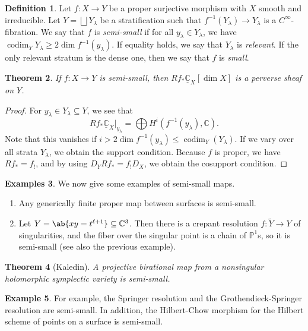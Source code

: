 \documentclass{amsart}
\newtheorem{thm}{Theorem}[section]
\theoremstyle{definition}
\newtheorem{defn}[thm]{Definition}
\newtheorem{exm}[thm]{Example}
\newtheorem{exms}[thm]{Examples}
\theoremstyle{remark}
\theoremstyle{plain}
\theoremstyle{definition}
\theoremstyle{remark}
\newcommand{\C}{\mathbb{C}}
\renewcommand{\P}{\mathbb{P}}
\newcommand{\on}[1]{\operatorname{#1}}
\newcommand{\ul}[1]{\underline{#1}}
\newcommand{\1}{\mathbf{1}}
\newcommand{\2}{\mathbf{2}}
\newcommand{\3}{\mathbf{3}}
\begin{document}
\begin{defn}
    Let \(f \colon X \to Y\) be a proper surjective morphism with \(X\) smooth and irreducible. Let \(Y = \bigsqcup Y_{\lambda}\) be a stratification such that \(f^{-1}(Y_{\lambda}) \to Y_{\lambda}\) is a \(C^{\infty}\)-fibration. We say that \(f\) is \textit{semi-small} if for all \(y_{\lambda} \in Y_{\lambda}\), we have \(\on{codim}_Y Y_{\lambda} \geq 2 \dim f^{-1} (y_{\lambda})\). If equality holds, we say that \(Y_{\lambda}\) is \textit{relevant}. If the only relevant stratum is the dense one, then we say that \(f\) is \textit{small}.
\end{defn}

\begin{thm}
    If \(f \colon X \to Y\) is semi-small, then \(R f_* \ul{\C}_X [\dim X]\) is a perverse sheaf on \(Y\).
\end{thm}

\begin{proof}
    For \(y_{\lambda} \in Y_{\lambda} \subseteq Y\), we see that
    \[ R f_* \ul{\C}_X |_{y_{\lambda}} = \bigoplus H^i (f^{-1}(y_{\lambda}), \C). \]
    Note that this vanishes if \(i > 2 \dim f^{-1}(y_{\lambda}) \leq \on{codim}_Y (Y_{\lambda})\). If we vary over all strata \(Y_{\lambda}\), we obtain the support condition. Because \(f\) is proper, we have \(R f_* = f_!\), and by using \(D_Y R f_* = f_! D_X\), we obtain the cosupport condition.
\end{proof}

\begin{exms}
    We now give some examples of semi-small maps.
    \begin{enumerate}
        \item Any generically finite proper map between surfaces is semi-small.
        \item Let \(Y = \ab\{xy = t^{\ell+1}\} \subseteq \C^3\). Then there is a crepant resolution \(f \colon \tilde{Y} \to Y\) of singularities, and the fiber over the singular point is a chain of \(\P^1\)s, so it is semi-small (see also the previous example).
    \end{enumerate}
\end{exms}

\begin{thm}[Kaledin]
    A projective birational map from a nonsingular holomorphic symplectic variety is semi-small.
\end{thm}

\begin{exm}
    For example, the Springer resolution and the Grothendieck-Springer resolution are semi-small. In addition, the Hilbert-Chow morphism for the Hilbert scheme of points on a surface is semi-small.
\end{exm}
\end{document}

